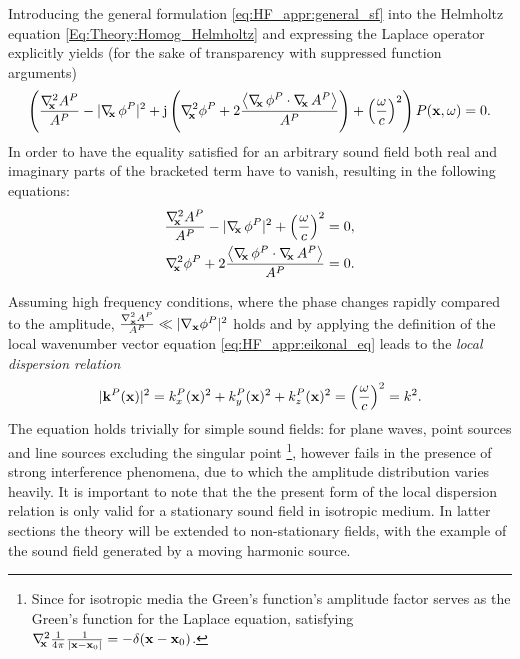 Introducing the general formulation \eqref{eq:HF_appr:general_sf} into the Helmholtz equation \eqref{Eq:Theory:Homog_Helmholtz} and expressing the Laplace operator explicitly yields (for the sake of transparency with suppressed function arguments)
\begin{equation}
\left( 
\frac{\Lx A^P}{A^P} 
- 
| \Dx \phi^P |^2
+ 
\ti \left(  
\Lx \phi^P
+ 2\frac{ \left< \Dx \phi^P \cdot \Dx A^P \right> }{A^P} 
\right)
+ \left(\frac{\omega}{c}\right)^2 
\right) 
P(\vx,\omega) = 0.
\label{eq:HF_appr:ray_tracing_helmholtz}
\end{equation}
In order to have the equality satisfied for an arbitrary sound field both real and imaginary parts of the bracketed term have to vanish, resulting in the following equations:
\begin{eqnarray} \label{eq:HF_appr:eikonal_eq}
\frac{\Lx A^P}{A^P}  - | \Dx \phi^P |^2 + \left(\frac{\omega}{c}\right)^2 = 0, \\ 
\label{eq:HF_appr:transport_eq}
\Lx \phi^P + 2\frac{ \left< \Dx \phi^P \cdot \Dx A^P \right> }{A^P} = 0.
\end{eqnarray}

Assuming high frequency conditions, where the phase changes rapidly compared to the amplitude, $\frac{\nabla^2_{\mathbf{x}} A^P}{A^P} \ll | \nabla_{\mathbf{x}} \phi^P |^2$ holds
and by applying the definition of the local wavenumber vector equation \eqref{eq:HF_appr:eikonal_eq} leads to the \emph{local dispersion relation}
\begin{equation}
|\mathbf{k}^P(\mathbf{x})|^2 = k^P_x(\mathbf{x})^2 + k^P_y(\mathbf{x})^2 + k^P_z(\mathbf{x})^2 = \left( \frac{\omega}{c} \right)^2 = k^2.
\label{eq:HF_appr:local_dispersion}
\end{equation}
%
The equation holds trivially for simple sound fields: for plane waves, point sources and line sources excluding the singular point \footnote{Since for isotropic media the Green's function's amplitude factor serves as the Green's function for the Laplace equation, satisfying $\nabla^2_{\!\!\mathbf{x}} \frac{1}{4\pi} \frac{1}{|\mathbf{x}-\mathbf{x}_0|} = -\delta(\mathbf{x}-\mathbf{x}_0)$.}, however fails in the presence of strong interference phenomena, due to which the amplitude distribution varies heavily.
It is important to note that the the present form of the local dispersion relation is only valid for a stationary sound field in isotropic medium.
In latter sections the theory will be extended to non-stationary fields, with the example of the sound field generated by a moving harmonic source.

